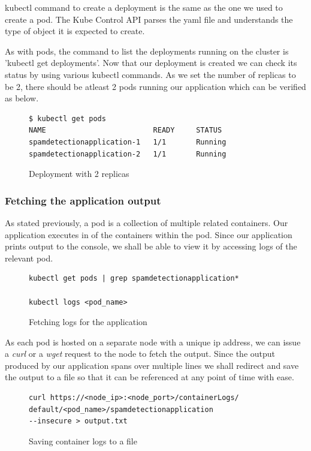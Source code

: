 \documentclass[9pt,twocolumn,twoside]{../../styles/osajnl}
\begin{document}
\noindent
kubectl command to create a deployment is the same as the one we used
to create a pod. The Kube Control API parses the yaml file and
understands the type of object it is expected to create.

\noindent
As with pods, the command to list the deployments running on the
cluster is 'kubectl get deployments'. Now that our deployment is
created we can check its status by using various kubectl commands. As
we set the number of replicas to be 2, there should be atleast 2 pods
running our application which can be verified as below.

\begin{figure}[H]
\begin{verbatim}
$ kubectl get pods
NAME                         READY     STATUS        
spamdetectionapplication-1   1/1       Running  
spamdetectionapplication-2   1/1       Running
\end{verbatim}
\caption{Deployment with 2 replicas}
\label{Deployment with 2 replicas}
\end{figure}

\subsubsection{Fetching the application output}
As stated previously, a pod is a collection of multiple related
containers. Our application executes in of the containers within the
pod. Since our application prints output to the console, we shall be
able to view it by accessing logs of the relevant pod.

\begin{figure}[H]
\begin{verbatim}
kubectl get pods | grep spamdetectionapplication*

kubectl logs <pod_name>
\end{verbatim}
\caption{Fetching logs for the application}
\vspace{-4mm}
\label{Fetching logs for the application}
\end{figure}

\noindent
As each pod is hosted on a separate node with a unique ip address, we
can issue a \emph{curl} or a \emph{wget} request to the node to fetch
the output.  Since the output produced by our application spans over
multiple lines we shall redirect and save the output to a file so that
it can be referenced at any point of time with ease.
\begin{figure}[H]
\begin{verbatim}
curl https://<node_ip>:<node_port>/containerLogs/
default/<pod_name>/spamdetectionapplication 
--insecure > output.txt
\end{verbatim}
\caption{Saving container logs to a file}
\vspace{-4mm}
\label{Saving container logs to a file}
\end{figure}
\end{document}
